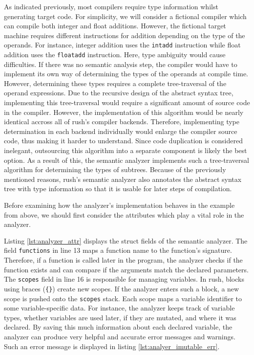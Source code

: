 As indicated previously, most compilers require type information whilst
generating target code. For simplicity, we will consider a fictional compiler
which can compile both integer and float additions. However, the fictional
target machine requires different instructions for addition depending on the
type of the operands. For instance, integer addition uses the \texttt{intadd} instruction
while float addition uses the \texttt{floatadd} instruction. Here, type ambiguity would
cause difficulties. If there was no semantic analysis step, the compiler would
have to implement its own way of determining the types of the operands at
compile time. However, determining these types requires a complete
tree-traversal of the operand expressions. Due to the recursive design of the
abstract syntax tree, implementing this tree-traversal would require a
significant amount of source code in the compiler. However, the implementation
of this algorithm would be nearly identical accross all of rush's compiler
backends. Therefore, implementing type determination in each backend
individually would enlarge the compiler source code, thus making it harder to
understand. Since code duplication is considered inelegant, outsourcing this
algorithm into a separate component is likely the best option. As a result of
this, the semantic analyzer implements such a tree-traversal algorithm for
determining the types of subtrees. Because of the previously mentioned reasons,
rush's semantic analyzer also annotates the abstract syntax tree with type
information so that it is usable for later steps of compilation.


Before examining how the analyzer's implementation behaves in the example from above,
we should first consider the attributes which play a vital role in the analyzer.


Listing \ref{lst:analyzer_attr} displays the struct fields of the semantic analyzer.
The field \texttt{functions} in line 13 maps a function name to the function's signature.
Therefore, if a function is called later in the program, the analyzer checks if the function exists and can compare if the arguments match the declared parameters.
The \texttt{scopes} field in line 16 is responsible for managing variables.
In rush, blocks using braces (\texttt{\{\}}) create new scopes.
If the analyzer enters such a block, a new scope is pushed onto the \texttt{scopes} stack.
Each scope maps a variable identifier to some variable-specific data.
For instance, the analyzer keeps track of variable types, whether variables are used later, if they are mutated, and where it was declared.
By saving this much information about each declared variable, the analyzer can produce very helpful and accurate error messages and warnings.
Such an error message is displayed in listing \ref{lst:analyer_imutable_err}.


